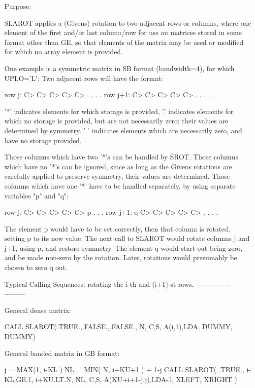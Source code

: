 \begin{DoxyParagraph}{Purpose\+: }
\begin{DoxyVerb}    SLAROT applies a (Givens) rotation to two adjacent rows or
    columns, where one element of the first and/or last column/row
    for use on matrices stored in some format other than GE, so
    that elements of the matrix may be used or modified for which
    no array element is provided.

    One example is a symmetric matrix in SB format (bandwidth=4), for
    which UPLO='L':  Two adjacent rows will have the format:

    row j:     C> C> C> C> C> .  .  .  .
    row j+1:      C> C> C> C> C> .  .  .  .

    '*' indicates elements for which storage is provided,
    '.' indicates elements for which no storage is provided, but
    are not necessarily zero; their values are determined by
    symmetry.  ' ' indicates elements which are necessarily zero,
     and have no storage provided.

    Those columns which have two '*'s can be handled by SROT.
    Those columns which have no '*'s can be ignored, since as long
    as the Givens rotations are carefully applied to preserve
    symmetry, their values are determined.
    Those columns which have one '*' have to be handled separately,
    by using separate variables "p" and "q":

    row j:     C> C> C> C> C> p  .  .  .
    row j+1:   q  C> C> C> C> C> .  .  .  .

    The element p would have to be set correctly, then that column
    is rotated, setting p to its new value.  The next call to
    SLAROT would rotate columns j and j+1, using p, and restore
    symmetry.  The element q would start out being zero, and be
    made non-zero by the rotation.  Later, rotations would presumably
    be chosen to zero q out.

    Typical Calling Sequences: rotating the i-th and (i+1)-st rows.
    ------- ------- ---------

      General dense matrix:

              CALL SLAROT(.TRUE.,.FALSE.,.FALSE., N, C,S,
                      A(i,1),LDA, DUMMY, DUMMY)

      General banded matrix in GB format:

              j = MAX(1, i-KL )
              NL = MIN( N, i+KU+1 ) + 1-j
              CALL SLAROT( .TRUE., i-KL.GE.1, i+KU.LT.N, NL, C,S,
                      A(KU+i+1-j,j),LDA-1, XLEFT, XRIGHT )


\end{DoxyVerb}
\end{DoxyParagraph}
